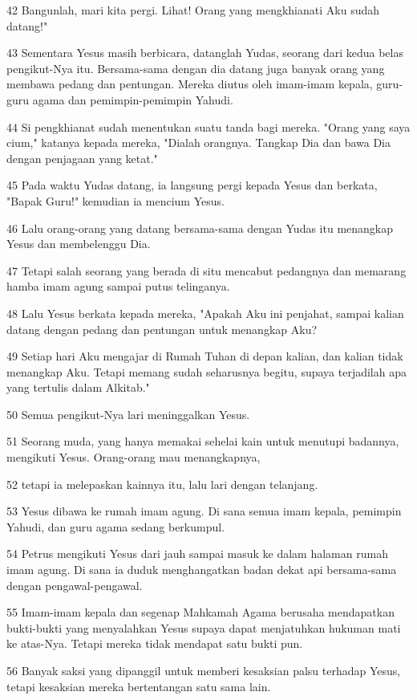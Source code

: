 \par 42 Bangunlah, mari kita pergi. Lihat! Orang yang mengkhianati Aku sudah datang!"
\par 43 Sementara Yesus masih berbicara, datanglah Yudas, seorang dari kedua belas pengikut-Nya itu. Bersama-sama dengan dia datang juga banyak orang yang membawa pedang dan pentungan. Mereka diutus oleh imam-imam kepala, guru-guru agama dan pemimpin-pemimpin Yahudi.
\par 44 Si pengkhianat sudah menentukan suatu tanda bagi mereka. "Orang yang saya cium," katanya kepada mereka, "Dialah orangnya. Tangkap Dia dan bawa Dia dengan penjagaan yang ketat."
\par 45 Pada waktu Yudas datang, ia langsung pergi kepada Yesus dan berkata, "Bapak Guru!" kemudian ia mencium Yesus.
\par 46 Lalu orang-orang yang datang bersama-sama dengan Yudas itu menangkap Yesus dan membelenggu Dia.
\par 47 Tetapi salah seorang yang berada di situ mencabut pedangnya dan memarang hamba imam agung sampai putus telinganya.
\par 48 Lalu Yesus berkata kepada mereka, "Apakah Aku ini penjahat, sampai kalian datang dengan pedang dan pentungan untuk menangkap Aku?
\par 49 Setiap hari Aku mengajar di Rumah Tuhan di depan kalian, dan kalian tidak menangkap Aku. Tetapi memang sudah seharusnya begitu, supaya terjadilah apa yang tertulis dalam Alkitab."
\par 50 Semua pengikut-Nya lari meninggalkan Yesus.
\par 51 Seorang muda, yang hanya memakai sehelai kain untuk menutupi badannya, mengikuti Yesus. Orang-orang mau menangkapnya,
\par 52 tetapi ia melepaskan kainnya itu, lalu lari dengan telanjang.
\par 53 Yesus dibawa ke rumah imam agung. Di sana semua imam kepala, pemimpin Yahudi, dan guru agama sedang berkumpul.
\par 54 Petrus mengikuti Yesus dari jauh sampai masuk ke dalam halaman rumah imam agung. Di sana ia duduk menghangatkan badan dekat api bersama-sama dengan pengawal-pengawal.
\par 55 Imam-imam kepala dan segenap Mahkamah Agama berusaha mendapatkan bukti-bukti yang menyalahkan Yesus supaya dapat menjatuhkan hukuman mati ke atas-Nya. Tetapi mereka tidak mendapat satu bukti pun.
\par 56 Banyak saksi yang dipanggil untuk memberi kesaksian palsu terhadap Yesus, tetapi kesaksian mereka bertentangan satu sama lain.
